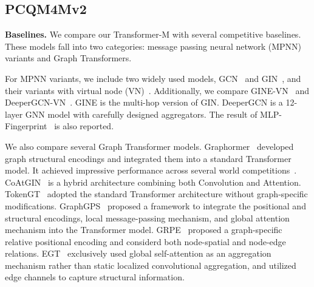 \documentclass{article} \usepackage[dvipsnames]{xcolor}
\begin{document}
\vspace{-5pt}
\subsection{PCQM4Mv2}
\label{app:pcq}
\vspace{-5pt}
\textbf{Baselines.}
We compare our Transformer-M with several competitive baselines. These models fall into two categories: message passing neural network (MPNN) variants and Graph Transformers.

For MPNN variants, we include two widely used models, GCN~\citep{kipf2016semi} and GIN~\citep{xu2018how}, and their variants with virtual node (VN)~\citep{gilmer2017neural,hu2020open}. Additionally, we compare GINE-{\scriptsize VN}~\citep{brossard2020graph} and DeeperGCN-{\scriptsize VN}~\citep{li2020deepergcn}. GINE is the multi-hop version of GIN. DeeperGCN is a 12-layer GNN model with carefully designed aggregators. The result of MLP-Fingerprint~\citep{hu2021ogb} is also reported.

We also compare several Graph Transformer models. Graphormer~\citep{ying2021transformers} developed graph structural encodings and integrated them into a standard Transformer model. It achieved impressive performance across several world competitions~\citep{ying2021first,shi2022benchmarking}. CoAtGIN~\citep{cui2022coatgin} is a hybrid architecture combining both Convolution and Attention. TokenGT~\citep{kim2022pure} adopted the standard Transformer architecture without graph-specific modifications. GraphGPS~\citep{rampavsek2022recipe} proposed a framework to integrate the positional and structural encodings, local message-passing mechanism, and global attention mechanism into the Transformer model. GRPE~\citep{park2022grpe} proposed a graph-specific relative positional encoding and considerd both node-spatial and node-edge relations. EGT~\citep{hussain2022global} exclusively used global self-attention as an aggregation mechanism rather than static localized convolutional aggregation, and utilized edge channels to capture structural information. 

\vspace{-5pt}
\end{document}
